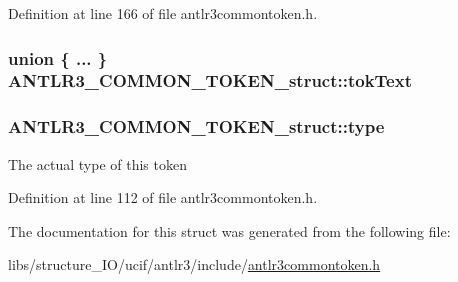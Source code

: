 Definition at line 166 of file antlr3commontoken.\-h.

\hypertarget{struct_a_n_t_l_r3___c_o_m_m_o_n___t_o_k_e_n__struct_ac372d2da239cee1053ecb9f38e79c52c}{
\subsubsection[{tok\-Text}]{\setlength{\rightskip}{0pt plus 5cm}union \{ ... \} 
                 A\-N\-T\-L\-R3\-\_\-\-C\-O\-M\-M\-O\-N\-\_\-\-T\-O\-K\-E\-N\-\_\-struct\-::tok\-Text}}\label{struct_a_n_t_l_r3___c_o_m_m_o_n___t_o_k_e_n__struct_ac372d2da239cee1053ecb9f38e79c52c}
\hypertarget{struct_a_n_t_l_r3___c_o_m_m_o_n___t_o_k_e_n__struct_a8c4bd5b1374d3b483d286de8cd68de23}{
\subsubsection[{type}]{ A\-N\-T\-L\-R3\-\_\-\-C\-O\-M\-M\-O\-N\-\_\-\-T\-O\-K\-E\-N\-\_\-struct\-::type}}\label{struct_a_n_t_l_r3___c_o_m_m_o_n___t_o_k_e_n__struct_a8c4bd5b1374d3b483d286de8cd68de23}
The actual type of this token 

Definition at line 112 of file antlr3commontoken.\-h.



The documentation for this struct was generated from the following file\-:\begin{DoxyCompactItemize}
\item 
libs/structure\-\_\-\-I\-O/ucif/antlr3/include/\hyperlink{antlr3commontoken_8h}{antlr3commontoken.\-h}\end{DoxyCompactItemize}

